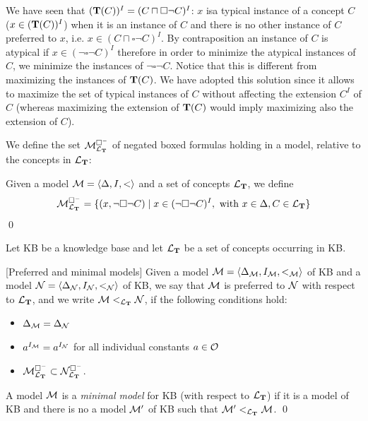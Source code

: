 \documentclass[a4paper, 11pt, oneside]{duthesis}
\newcommand{\tip}{{\bf T}}
\newcommand{\nott} {\lnot}
\newcommand{\tc} {\mid}
\newcommand{\bbox}{\square}
\newcommand{\sx} {\langle}
\newcommand{\dx} {\rangle}
\newcommand{\ellet} {\mathcal{L}_{\bf T}}
\newcommand{\emme} {\begin{mathcal}M\end{mathcal}}
\newcommand{\enne} {\begin{mathcal}N\end{mathcal}}
\newenvironment{definition}
{\begin{defi} \rm}{\qed \end{defi}}
\newenvironment{definition}
{\begin{defi} \rm}{\qed \end{defi}}
\newtheorem{definition}{Definition}
\newcounter{posu}
\newtheorem{definition}[posu]{Definition}
\begin{document}
We have seen that $(\tip(C))^I =(C \sqcap \bbox \neg C)^I$: $x$ isa typical instance  of a concept $C$ ($x \in (\tip(C))^I$) when it is an instance of $C$  and there is no other instance of $C$ preferred to $x$, i.e. $x \in (C \sqcap \bbox \neg C)^I$.
By contraposition an instance of $C$ is atypical if $x \in (\neg \bbox \neg C)^I$ therefore in order to minimize the atypical instances of $C$, we minimize the instances of $\neg \bbox \neg C$.
Notice that this is different from maximizing the instances of $\tip(C)$.
We have adopted this solution since it allows to maximize the set of typical instances of $C$ without affecting the extension $C^I$ of $C$ (whereas maximizing the extension of $\tip(C)$  would imply maximizing also the extension of $C$).

We define the set $\emme^{\bbox^-}_{\ellet}$ of negated boxed formulas holding in a model, relative to the concepts in $\ellet$:

\begin{definition}
Given a model $\emme=\sx \Delta, I, <\dx$ and a set of concepts $\ellet$, we define $$\emme^{\bbox^-}_{\ellet}=\{(x, \nott \bbox \nott C) \tc x \in (\nott \bbox \nott C)^I, \ \mbox{with} \ x \in \Delta, C \in \ellet \}$$
\end{definition}


\noindent Let KB be a knowledge base and let ${\ellet}$ be a set of concepts occurring in KB.

\begin{definition}[Preferred and minimal models]\label{def preferred and minimal models}
Given a model $\emme=\sx \Delta_{\emme}, I_{\emme}, <_{\emme} \dx$ of KB and  a model $\enne=\sx \Delta_{\enne}, I_{\enne}, <_{\enne} \dx$ of KB, we say that $\emme$ is preferred to $\enne$ with respect to ${\ellet}$, and we write $\emme <_{\ellet} \enne$, if the following conditions hold:

\begin{itemize}
\item $\Delta_{\emme}=\Delta_{\enne}$
\item $a^{I_{\emme}}=a^{I_{\enne}}$ for all individual constants $a \in \begin{mathcal}O\end{mathcal}$
\item $\emme^{\bbox^-}_{\ellet} \subset \enne^{\bbox^-}_{\ellet}$.
\end{itemize}

\noindent A model $\emme$ is a \emph{minimal model} for KB (with respect to ${\ellet}$) if it is a model of KB and there is no a model $\emme'$ of KB such that $\emme' <_{\ellet} \emme$.
\end{definition}
\end{document}
